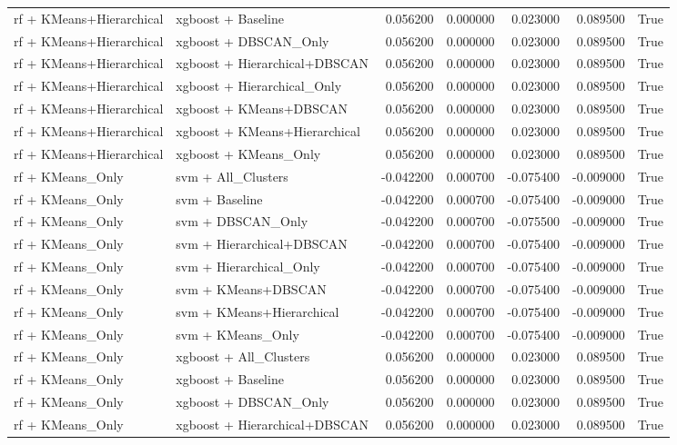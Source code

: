 \begin{tabular}{llrrrrr}
rf + KMeans+Hierarchical & xgboost + Baseline & 0.056200 & 0.000000 & 0.023000 & 0.089500 & True \\
rf + KMeans+Hierarchical & xgboost + DBSCAN_Only & 0.056200 & 0.000000 & 0.023000 & 0.089500 & True \\
rf + KMeans+Hierarchical & xgboost + Hierarchical+DBSCAN & 0.056200 & 0.000000 & 0.023000 & 0.089500 & True \\
rf + KMeans+Hierarchical & xgboost + Hierarchical_Only & 0.056200 & 0.000000 & 0.023000 & 0.089500 & True \\
rf + KMeans+Hierarchical & xgboost + KMeans+DBSCAN & 0.056200 & 0.000000 & 0.023000 & 0.089500 & True \\
rf + KMeans+Hierarchical & xgboost + KMeans+Hierarchical & 0.056200 & 0.000000 & 0.023000 & 0.089500 & True \\
rf + KMeans+Hierarchical & xgboost + KMeans_Only & 0.056200 & 0.000000 & 0.023000 & 0.089500 & True \\
rf + KMeans_Only & svm + All_Clusters & -0.042200 & 0.000700 & -0.075400 & -0.009000 & True \\
rf + KMeans_Only & svm + Baseline & -0.042200 & 0.000700 & -0.075400 & -0.009000 & True \\
rf + KMeans_Only & svm + DBSCAN_Only & -0.042200 & 0.000700 & -0.075500 & -0.009000 & True \\
rf + KMeans_Only & svm + Hierarchical+DBSCAN & -0.042200 & 0.000700 & -0.075400 & -0.009000 & True \\
rf + KMeans_Only & svm + Hierarchical_Only & -0.042200 & 0.000700 & -0.075400 & -0.009000 & True \\
rf + KMeans_Only & svm + KMeans+DBSCAN & -0.042200 & 0.000700 & -0.075400 & -0.009000 & True \\
rf + KMeans_Only & svm + KMeans+Hierarchical & -0.042200 & 0.000700 & -0.075400 & -0.009000 & True \\
rf + KMeans_Only & svm + KMeans_Only & -0.042200 & 0.000700 & -0.075400 & -0.009000 & True \\
rf + KMeans_Only & xgboost + All_Clusters & 0.056200 & 0.000000 & 0.023000 & 0.089500 & True \\
rf + KMeans_Only & xgboost + Baseline & 0.056200 & 0.000000 & 0.023000 & 0.089500 & True \\
rf + KMeans_Only & xgboost + DBSCAN_Only & 0.056200 & 0.000000 & 0.023000 & 0.089500 & True \\
rf + KMeans_Only & xgboost + Hierarchical+DBSCAN & 0.056200 & 0.000000 & 0.023000 & 0.089500 & True \\

\end{tabular}
